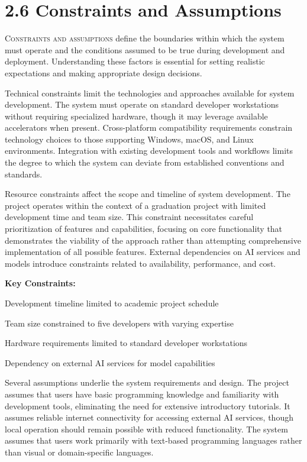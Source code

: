 \clearpage
\section{2.6 Constraints and Assumptions}
\label{sec:constraints-assumptions}

\lettrine{C}{onstraints and assumptions} define the boundaries within which the system must operate and the conditions assumed to be true during development and deployment. Understanding these factors is essential for setting realistic expectations and making appropriate design decisions.

Technical constraints limit the technologies and approaches available for system development. The system must operate on standard developer workstations without requiring specialized hardware, though it may leverage available accelerators when present. Cross-platform compatibility requirements constrain technology choices to those supporting Windows, macOS, and Linux environments. Integration with existing development tools and workflows limits the degree to which the system can deviate from established conventions and standards.

Resource constraints affect the scope and timeline of system development. The project operates within the context of a graduation project with limited development time and team size. This constraint necessitates careful prioritization of features and capabilities, focusing on core functionality that demonstrates the viability of the approach rather than attempting comprehensive implementation of all possible features. External dependencies on AI services and models introduce constraints related to availability, performance, and cost.

\textbf{Key Constraints:}
\begin{compactlist}
    \item Development timeline limited to academic project schedule
    \item Team size constrained to five developers with varying expertise
    \item Hardware requirements limited to standard developer workstations
    \item Dependency on external AI services for model capabilities
\end{compactlist}

Several assumptions underlie the system requirements and design. The project assumes that users have basic programming knowledge and familiarity with development tools, eliminating the need for extensive introductory tutorials. It assumes reliable internet connectivity for accessing external AI services, though local operation should remain possible with reduced functionality. The system assumes that users work primarily with text-based programming languages rather than visual or domain-specific languages.

